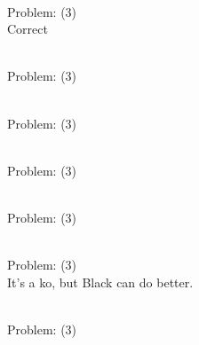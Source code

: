 \documentclass[11pt]{article}
\begin{document}
\begin{minipage}[t]{0.5\textwidth}
  {\centering
  
\\
Problem: (3)\\
Correct\\
  }
\end{minipage}
\begin{minipage}[t]{0.5\textwidth}
  {\centering
  
\\
Problem: (3)\\
  }
\end{minipage}
\begin{minipage}[t]{0.5\textwidth}
  {\centering
  
\\
Problem: (3)\\
  }
\end{minipage}
\begin{minipage}[t]{0.5\textwidth}
  {\centering
  
\\
Problem: (3)\\
  }
\end{minipage}
\begin{minipage}[t]{0.5\textwidth}
  {\centering
  
\\
Problem: (3)\\
  }
\end{minipage}
\begin{minipage}[t]{0.5\textwidth}
  {\centering
  
\\
Problem: (3)\\
It's a ko, but Black can do better.\\
  }
\end{minipage}
\begin{minipage}[t]{0.5\textwidth}
  {\centering
  
\\
Problem: (3)\\
  }
\end{minipage}
\end{document}
